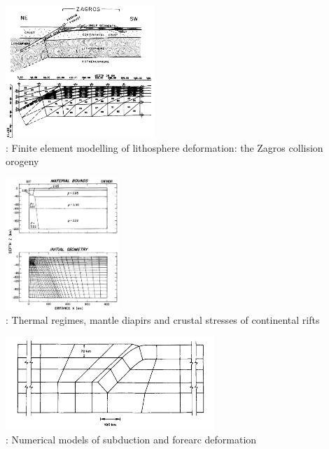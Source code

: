 \begin{center}
\begin{minipage}{0.45\textwidth}
\centering
\includegraphics[height=5cm]{images/history/bird78b}\\
{: Finite element modelling of lithosphere deformation: the Zagros collision 
orogeny \cite{bird78b}}
\end{minipage}\hfill
\begin{minipage}{0.45\textwidth}
\centering
\includegraphics[height=5cm]{images/history/brpo81}\\
{: Thermal regimes, mantle diapirs and crustal stresses of continental rifts \cite{brpo81}}
\end{minipage}
\end{center}

\begin{center}
\includegraphics[height=3.5cm]{images/history/thar85}\\
{: Numerical models of subduction and forearc deformation \cite{thar85}}
\end{center}

